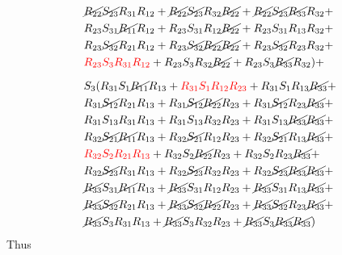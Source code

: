 \begin{equation}
\begin{split}
        &   \cancel{R_{22}}\cancel{S_{23}}R_{31}R_{12} + \cancel{R_{22}}\cancel{S_{23}}R_{32}\cancel{R_{22}} + \cancel{R_{22}}\cancel{S_{23}}\cancel{R_{33}}R_{32} +    \\
        &   R_{23}S_{31}\cancel{R_{11}}R_{12} + R_{23}S_{31}R_{12}\cancel{R_{22}} + R_{23}S_{31}R_{13}R_{32} +    \\
        &   R_{23}\cancel{S_{32}}R_{21}R_{12} + R_{23}\cancel{S_{32}}\cancel{R_{22}}\cancel{R_{22}} + R_{23}\cancel{S_{32}}R_{23}R_{32} +    \\
        &   {\color{red}R_{23}S_{3}R_{31}R_{12}} + R_{23}S_{3}R_{32}\cancel{R_{22}} + R_{23}S_{3}\cancel{R_{33}}R_{32} 
        ) + \\[6pt]
        &   S_{3}(
            R_{31}S_{1}\cancel{R_{11}}R_{13} + {\color{red}R_{31}S_{1}R_{12}R_{23}} + R_{31}S_{1}R_{13}\cancel{R_{33}} +    \\
        &   R_{31}\cancel{S_{12}}R_{21}R_{13} + R_{31}\cancel{S_{12}}\cancel{R_{22}}R_{23} + R_{31}\cancel{S_{12}}R_{23}\cancel{R_{33}} +    \\
        &   R_{31}S_{13}R_{31}R_{13} + R_{31}S_{13}R_{32}R_{23} + R_{31}S_{13}\cancel{R_{33}}\cancel{R_{33}} +    \\
        &   R_{32}\cancel{S_{21}}\cancel{R_{11}}R_{13} + R_{32}\cancel{S_{21}}R_{12}R_{23} + R_{32}\cancel{S_{21}}R_{13}\cancel{R_{33}} +    \\
        &   {\color{red}R_{32}S_{2}R_{21}R_{13}} + R_{32}S_{2}\cancel{R_{22}}R_{23} + R_{32}S_{2}R_{23}\cancel{R_{33}} +    \\
        &   R_{32}\cancel{S_{23}}R_{31}R_{13} + R_{32}\cancel{S_{23}}R_{32}R_{23} + R_{32}\cancel{S_{23}}\cancel{R_{33}}\cancel{R_{33}} +    \\
        &   \cancel{R_{33}}S_{31}\cancel{R_{11}}R_{13} + \cancel{R_{33}}S_{31}R_{12}R_{23} + \cancel{R_{33}}S_{31}R_{13}\cancel{R_{33}} +    \\
        &   \cancel{R_{33}}\cancel{S_{32}}R_{21}R_{13} + \cancel{R_{33}}\cancel{S_{32}}\cancel{R_{22}}R_{23} + \cancel{R_{33}}\cancel{S_{32}}R_{23}\cancel{R_{33}} +    \\
        &   \cancel{R_{33}}S_{3}R_{31}R_{13} + \cancel{R_{33}}S_{3}R_{32}R_{23} + \cancel{R_{33}}S_{3}\cancel{R_{33}}\cancel{R_{33}})
    \end{split}
\end{equation}
\newpage
Thus
